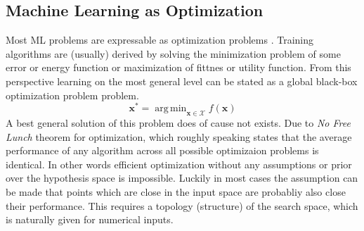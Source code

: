 \documentclass[english]{article}
\newcommand{\x}{\mathbf{x}}
\DeclareMathOperator*{\argmin}{arg\,min}
\begin{document}
\subsection{Machine Learning as Optimization}
Most \acf{ML} problems are expressable as optimization problems \cite{bennett_interplay_2006}. Training algorithms are (usually) derived by solving the minimization problem of some error or energy function or maximization of fittnes or utility function. From this perspective learning on the most general level can be stated as a global black-box optimization problem problem.
$$\x^* = \argmin_{\x \in \mathcal{X}} f(\x)$$
A best general solution of this problem does of cause not exists. Due to \textit{No Free Lunch} theorem for optimization, which roughly speaking states that the average performance of any algorithm across all possible optimizaion problems is identical. In other words efficient optimization without any assumptions or prior over the hypothesis space is impossible. Luckily in most cases the assumption can be made that points which are close in the input space are probabliy also close their performance. This requires a topology (structure) of the search space, which is naturally given for numerical inputs.
\end{document}
